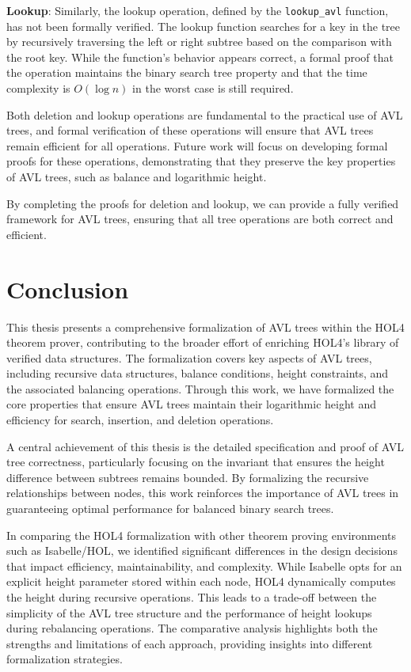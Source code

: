 \documentclass[12pt]{article}
\begin{document}
\begin{itemize}
\textbf{Lookup}: Similarly, the lookup operation, defined by the \texttt{lookup\_avl} function, has not been formally verified. The lookup function searches for a key in the tree by recursively traversing the left or right subtree based on the comparison with the root key. While the function’s behavior appears correct, a formal proof that the operation maintains the binary search tree property and that the time complexity is \( O(\log n) \) in the worst case is still required.

Both deletion and lookup operations are fundamental to the practical use of AVL trees, and formal verification of these operations will ensure that AVL trees remain efficient for all operations. Future work will focus on developing formal proofs for these operations, demonstrating that they preserve the key properties of AVL trees, such as balance and logarithmic height.

By completing the proofs for deletion and lookup, we can provide a fully verified framework for AVL trees, ensuring that all tree operations are both correct and efficient.



\section{Conclusion}
This thesis presents a comprehensive formalization of AVL trees within the HOL4 theorem prover, contributing to the broader effort of enriching HOL4's library of verified data structures. The formalization covers key aspects of AVL trees, including recursive data structures, balance conditions, height constraints, and the associated balancing operations. Through this work, we have formalized the core properties that ensure AVL trees maintain their logarithmic height and efficiency for search, insertion, and deletion operations.

A central achievement of this thesis is the detailed specification and proof of AVL tree correctness, particularly focusing on the invariant that ensures the height difference between subtrees remains bounded. By formalizing the recursive relationships between nodes, this work reinforces the importance of AVL trees in guaranteeing optimal performance for balanced binary search trees.

In comparing the HOL4 formalization with other theorem proving environments such as Isabelle/HOL, we identified significant differences in the design decisions that impact efficiency, maintainability, and complexity. While Isabelle opts for an explicit height parameter stored within each node, HOL4 dynamically computes the height during recursive operations. This leads to a trade-off between the simplicity of the AVL tree structure and the performance of height lookups during rebalancing operations. The comparative analysis highlights both the strengths and limitations of each approach, providing insights into different formalization strategies.


\end{itemize}
\end{document}

